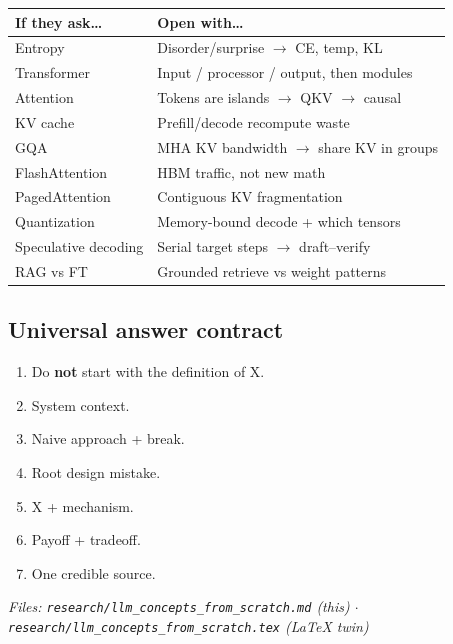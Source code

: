 \documentclass[11pt,a4paper]{article}
\begin{document}
{{\begin{table}[ht]
\centering\small
\begin{tabularx}{\textwidth}{@{}YY@{}}
\toprule
\textbf{If they ask\ldots{}} & \textbf{Open with\ldots{}} \\
\midrule
Entropy & Disorder/surprise $\rightarrow$ CE, temp, KL \\
Transformer & Input / processor / output, then modules \\
Attention & Tokens are islands $\rightarrow$ QKV $\rightarrow$ causal \\
KV cache & Prefill/decode recompute waste \\
GQA & MHA KV bandwidth $\rightarrow$ share KV in groups \\
FlashAttention & HBM traffic, not new math \\
PagedAttention & Contiguous KV fragmentation \\
Quantization & Memory-bound decode + which tensors \\
Speculative decoding & Serial target steps $\rightarrow$ draft--verify \\
RAG vs FT & Grounded retrieve vs weight patterns \\
\bottomrule
\end{tabularx}
\end{table}


\subsection{Universal answer contract}

\begin{enumerate}
\item Do \textbf{not} start with the definition of X.  
\item System context.  
\item Naive approach + break.  
\item Root design mistake.  
\item X + mechanism.  
\item Payoff + tradeoff.  
\item One credible source.
\end{enumerate}


\bigskip


\textit{Files: \texttt{research/llm\_concepts\_from\_scratch.md} (this) $\cdot$ \texttt{research/llm\_concepts\_from\_scratch.tex} (LaTeX twin)}


\begin{thebibliography}{99}


\end{thebibliography}}}
\end{document}
